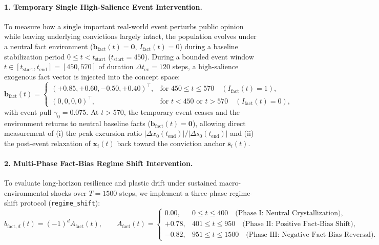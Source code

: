\paragraph{1. Temporary Single High-Salience Event Intervention.}
To measure how a single important real-world event perturbs public opinion while leaving underlying convictions largely intact, the population evolves under a neutral fact environment ($\mathbf{b}_{\mathrm{fact}}(t) = \mathbf{0}$, $I_{\mathrm{fact}}(t) = 0$) during a baseline stabilization period $0 \le t < t_{\mathrm{start}}$ ($t_{\mathrm{start}} = 450$). During a bounded event window $t \in [t_{\mathrm{start}}, t_{\mathrm{end}}] = [450, 570]$ of duration $\Delta t_{\mathrm{ev}} = 120$ steps, a high-salience exogenous fact vector is injected into the concept space:
\begin{equation}
    \mathbf{b}_{\mathrm{fact}}(t) =
    \begin{cases}
        (+0.85, +0.60, -0.50, +0.40)^\top, & \text{for } 450 \le t \le 570 \quad (I_{\mathrm{fact}}(t) = 1), \\[4pt]
        (0, 0, 0, 0)^\top, & \text{for } t < 450 \text{ or } t > 570 \quad (I_{\mathrm{fact}}(t) = 0),
    \end{cases}
    \label{eq:single_event_intervention}
\end{equation}
with event pull $\gamma_0 = 0.075$. At $t > 570$, the temporary event ceases and the environment returns to neutral baseline facts ($\mathbf{b}_{\mathrm{fact}}(t) = \mathbf{0}$), allowing direct measurement of (i) the peak excursion ratio $|\Delta \bar{x}_0(t_{\mathrm{end}})| / |\Delta \bar{s}_0(t_{\mathrm{end}})|$ and (ii) the post-event relaxation of $\mathbf{x}_i(t)$ back toward the conviction anchor $\mathbf{s}_i(t)$.

\paragraph{2. Multi-Phase Fact-Bias Regime Shift Intervention.}
To evaluate long-horizon resilience and plastic drift under sustained macro-environmental shocks over $T = 1500$ steps, we implement a three-phase regime-shift protocol (\texttt{regime\_shift}):
\begin{equation}
    b_{\mathrm{fact}, d}(t) = (-1)^d A_{\mathrm{fact}}(t), \qquad
    A_{\mathrm{fact}}(t) =
    \begin{cases}
        0.00, & 0 \le t \le 400 \quad \text{(Phase I: Neutral Crystallization)}, \\[4pt]
        +0.78, & 401 \le t \le 950 \quad \text{(Phase II: Positive Fact-Bias Shift)}, \\[4pt]
        -0.82, & 951 \le t \le 1500 \quad \text{(Phase III: Negative Fact-Bias Reversal)}.
    \end{cases}
    \label{eq:regime_shift_intervention}
\end{equation}


